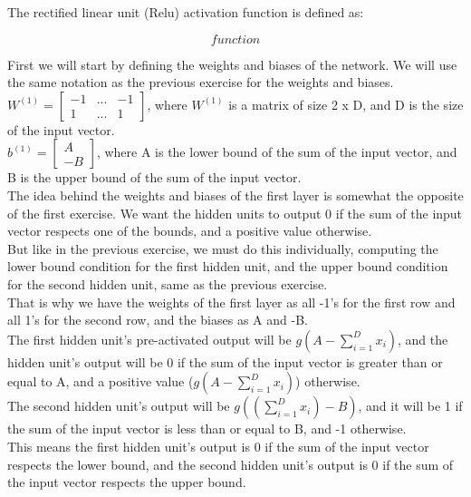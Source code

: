 \documentclass{article}
\begin{document}
The rectified linear unit (Relu) activation function is defined as:

\[ 
    function
\]

First we will start by defining the weights and biases of the network. We will use the same notation as the previous 
exercise for the weights and biases. \\

\( W^{(1)} = \begin{bmatrix}
    -1 & ...  & -1\\
    1 & ... & 1
\end{bmatrix}
\), where \(W^{(1)}\) is a matrix of size 2 x D, and D is the size of the input vector. \\

\(b^{(1)} = \begin{bmatrix}
    A\\
    -B
\end{bmatrix}
\), where A is the lower bound of the sum of the input vector, and B is the upper bound of the sum of the input vector. \\

The idea behind the weights and biases of the first layer is somewhat the opposite of the first exercise. We want the hidden units to output 0
if the sum of the input vector respects one of the bounds, and a positive value otherwise.\\

But like in the previous exercise, we must do this individually, computing the lower bound condition for the first hidden unit, 
and the upper bound condition for the second hidden unit, same as the previous exercise. \\

That is why we have the weights of the first layer as all -1's for the first row and all 1's for the second row, and the biases as A and -B. \\
The first hidden unit's pre-activated output will be $g(A - \sum_{i=1}^{D} x_i)$, and the hidden unit's output 
will be 0 if the sum of the input vector is greater than or equal to A, and a positive value ($g(A - \sum_{i=1}^{D} x_i)$) otherwise. \\
The second hidden unit's output will be $g((\sum_{i=1}^{D} x_i) - B)$, and it will be 1 if the sum of the input vector is less than or equal to B, 
and -1 otherwise. \\
This means the first hidden unit's output is 0 if the sum of the input vector respects the lower bound, 
and the second hidden unit's output is 0 if the sum of the input vector respects the upper bound. \\
\end{document}
